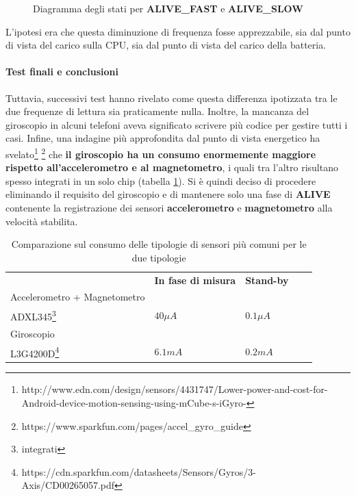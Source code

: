 \documentclass[a4paper,10pt]{memoir}
\begin{document}
\begin{figure}[ht]
\centering
\caption{Diagramma degli stati per \textbf{ALIVE\_FAST} e \textbf{ALIVE\_SLOW}}
\label{fig:scs_sm4}
\end{figure}

L'ipotesi era che questa diminuzione di frequenza fosse apprezzabile, sia dal punto di vista del carico sulla CPU, sia dal punto di vista del carico della batteria.

\paragraph{Test finali e conclusioni} Tuttavia, successivi test hanno rivelato come questa differenza ipotizzata tra le due frequenze di lettura sia praticamente nulla. Inoltre, la mancanza del giroscopio in alcuni telefoni aveva significato scrivere più codice per gestire tutti i casi. Infine, una indagine più approfondita dal punto di vista energetico ha svelato\footnote{http://www.edn.com/design/sensors/4431747/Lower-power-and-cost-for-Android-device-motion-sensing-using-mCube-s-iGyro-} \footnote{https://www.sparkfun.com/pages/accel\_gyro\_guide} che \textbf{il giroscopio ha un consumo enormemente maggiore rispetto all'accelerometro e al magnetometro}, i quali tra l'altro risultano spesso integrati in un solo chip (tabella \ref{table:consumosensori}). Si è quindi deciso di procedere eliminando il requisito del giroscopio e di mantenere solo una fase di \textbf{ALIVE} contenente la registrazione dei sensori \textbf{accelerometro} e \textbf{magnetometro} alla velocità stabilita.

\begin{table}[h]
\centering
\caption{Comparazione sul consumo delle tipologie di sensori più comuni per le due tipologie}
\label{table:consumosensori}
\begin{tabular}{lllll}
& \textbf{In fase di misura} & \textbf{Stand-by} & \\
Accelerometro + Magnetometro \\
ADXL345\footnote{integrati} & $40 \mu A$ & $0.1 \mu A$ &  \\
Giroscopio \\
L3G4200D\footnote{https://cdn.sparkfun.com/datasheets/Sensors/Gyros/3-Axis/CD00265057.pdf} & $6.1mA$ & $0.2mA$ &
\end{tabular}
\end{table}
\end{document}
